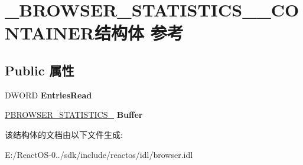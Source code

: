 \hypertarget{struct___b_r_o_w_s_e_r___s_t_a_t_i_s_t_i_c_s__101___c_o_n_t_a_i_n_e_r}{}\section{\+\_\+\+B\+R\+O\+W\+S\+E\+R\+\_\+\+S\+T\+A\+T\+I\+S\+T\+I\+C\+S\+\_\+\_\+\+C\+O\+N\+T\+A\+I\+N\+E\+R结构体 参考}
\label{struct___b_r_o_w_s_e_r___s_t_a_t_i_s_t_i_c_s__101___c_o_n_t_a_i_n_e_r}
\subsection*{Public 属性}
\begin{DoxyCompactItemize}
\item 
\mbox{\label{struct___b_r_o_w_s_e_r___s_t_a_t_i_s_t_i_c_s__101___c_o_n_t_a_i_n_e_r_a3997c09dc3afb271c2ed9b530622f5b3}} 
D\+W\+O\+RD {\bfseries Entries\+Read}
\item 
\mbox{\label{struct___b_r_o_w_s_e_r___s_t_a_t_i_s_t_i_c_s__101___c_o_n_t_a_i_n_e_r_a7f749688c1a2e253cfa151e1442034ff}} 
\hyperlink{struct___b_r_o_w_s_e_r___s_t_a_t_i_s_t_i_c_s__101}{P\+B\+R\+O\+W\+S\+E\+R\+\_\+\+S\+T\+A\+T\+I\+S\+T\+I\+C\+S\+\_} {\bfseries Buffer}
\end{DoxyCompactItemize}


该结构体的文档由以下文件生成\+:\begin{DoxyCompactItemize}
\item 
E\+:/\+React\+O\+S-\/0../sdk/include/reactos/idl/browser.\+idl\end{DoxyCompactItemize}
